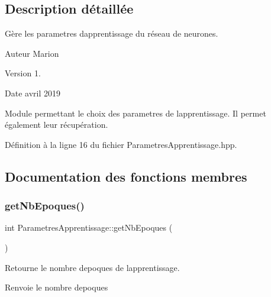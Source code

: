 \subsection{Description détaillée}
Gère les parametres d\textquotesingle{}apprentissage du réseau de neurones. 

\begin{DoxyAuthor}{Auteur}
Marion 
\end{DoxyAuthor}
\begin{DoxyVersion}{Version}
1. 
\end{DoxyVersion}
\begin{DoxyDate}{Date}
avril 2019
\end{DoxyDate}
Module permettant le choix des parametres de l\textquotesingle{}apprentissage. Il permet également leur récupération. 

Définition à la ligne 16 du fichier Parametres\+Apprentissage.\+hpp.



\subsection{Documentation des fonctions membres}
\mbox{\label{class_parametres_apprentissage_ad4342b1543901201ad28b1da5c11dc26}} 
\subsubsection{\texorpdfstring{get\+Nb\+Epoques()}{getNbEpoques()}}
{\footnotesize\ttfamily int Parametres\+Apprentissage\+::get\+Nb\+Epoques (\begin{DoxyParamCaption}{ }\end{DoxyParamCaption})}



Retourne le nombre d\textquotesingle{}epoques de l\textquotesingle{}apprentissage. 

\begin{DoxyReturn}{Renvoie}
le nombre d\textquotesingle{}epoques 
\end{DoxyReturn}
\mbox{\label{class_parametres_apprentissage_aa5b6d225498ee1270996ace135745fdd}} 
